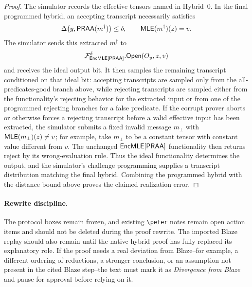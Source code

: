 \begin{proof}
The simulator records the effective tensors named in Hybrid~0.  In the final
programmed hybrid, an accepting transcript necessarily satisfies
\[
  \Delta\bigl(y,\mathsf{PRAA}(m^\dagger)\bigr)\le\delta,
  \qquad
  \mathsf{MLE}(m^\dagger)(z)=v.
\]
The simulator sends this extracted \(m^\dagger\) to
\[
  \mathcal F_{\mathsf{EncMLE}[\mathsf{PRAA}]}^\delta.\mathsf{Open}(O_y,z,v)
\]
and receives the ideal output bit.  It then samples the remaining transcript
conditioned on that ideal bit: accepting transcripts are sampled only from the
all-predicates-good branch above, while rejecting transcripts are sampled either
from the functionality's rejecting behavior for the extracted input or from one
of the programmed rejecting branches for a false predicate.  If the corrupt
prover aborts or otherwise forces a rejecting transcript before a valid
effective input has been extracted, the simulator submits a fixed invalid
message \(m_{\bot}\) with \(\mathsf{MLE}(m_{\bot})(z)\ne v\); for example, take
\(m_{\bot}\) to be a constant tensor with constant value different from
\(v\).  The unchanged \(\mathsf{EncMLE}[\mathsf{PRAA}]\) functionality then returns reject by
its wrong-evaluation rule.  Thus the ideal functionality determines the output,
and the simulator's challenge programming supplies a transcript distribution
matching the final hybrid.  Combining the programmed hybrid with the distance
bound above proves the claimed realization error.
\end{proof}

\paragraph{Rewrite discipline.}
The protocol boxes remain frozen, and existing \verb|\peter| notes remain open
action items and should not be deleted during the proof rewrite.  The imported
Blaze replay should also remain until the native hybrid proof has fully
replaced its explanatory role.  If the proof needs a real deviation from
Blaze--for example, a different ordering of reductions, a stronger conclusion,
or an assumption not present in the cited Blaze step--the text must mark it as
\emph{Divergence from Blaze} and pause for approval before relying on it.

